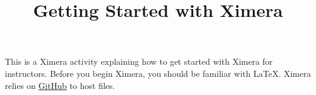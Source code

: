 \documentclass{ximera}
\title{Getting Started with Ximera}
\begin{document}
\maketitle

This is a Ximera activity explaining how to get started with Ximera for instructors. 
Before you begin Ximera, you should be familiar with \LaTeX.
Ximera relies on \href{https://github.com}{GitHub} to host files.
\end{document}

